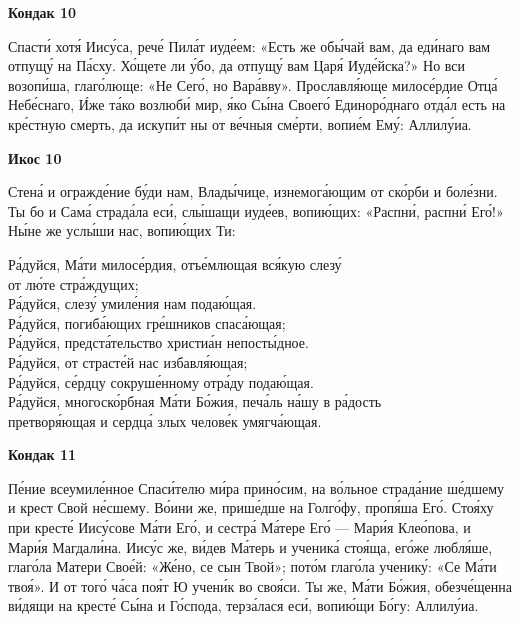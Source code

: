 \documentclass[14pt,article,oneside]{memoir}
\begin{document}
\begin{center}
  \textbf{Кондак 10}
\end{center}

Спасти́ хотя́ Иису́са, рече́ Пила́т иуде́ем: «Есть же обы́чай вам, да еди́наго вам отпущу́ на Па́сху. Хо́щете ли у́бо, да отпущу́ вам Царя́ Иуде́йска?» Но вси возопи́ша, глаго́люще: «Не Сего́, но Вара́вву». Прославля́юще милосе́рдие Отца́ Небе́снаго, И́же та́ко возлюби́ мир, я́ко Сы́на Своего́ Единоро́днаго отда́л есть на кре́стную смерть, да искупи́т ны от ве́чныя сме́рти, вопие́м Ему́: Аллилу́иа.

\begin{center}
  \textbf{Икос 10}
\end{center}

Стена́ и огражде́ние бу́ди нам, Влады́чице, изнемога́ющим от ско́рби и боле́зни. Ты бо и Сама́ страда́ла еси́, слы́шащи иуде́ев, вопию́щих: «Распни́, распни́ Его́!» Ны́не же услы́ши нас, вопию́щих Ти:

\noindent Ра́дуйся, Ма́ти милосе́рдия, отъе́млющая вся́кую слезу́\\ \vin от лю́те стра́ждущих;\\ Ра́дуйся, слезу́ умиле́ния нам подаю́щая.\\
Ра́дуйся, погиба́ющих гре́шников спаса́ющая;\\ Ра́дуйся, предста́тельство христиа́н непосты́дное.\\
Ра́дуйся, от страсте́й нас избавля́ющая;\\ Ра́дуйся, се́рдцу сокруше́нному отра́ду подаю́щая.\\
Ра́дуйся, многоско́рбная Ма́ти Бо́жия, печа́ль на́шу в ра́дость\\ \vin претворя́ющая и сердца́ злых челове́к умягча́ющая.

\begin{center}
  \textbf{Кондак 11}
\end{center}

Пе́ние всеумиле́нное Спаси́телю ми́ра прино́сим, на во́льное страда́ние ше́дшему и крест Свой не́сшему. Во́ини же, прише́дше на Голго́фу, пропя́ша Его́. Стоя́ху при кресте́ Иису́сове Ма́ти Его́, и сестра́ Ма́тере Его́ — Мари́я Клео́пова, и Мари́я Магдали́на. Иису́с же, ви́дев Ма́терь и ученика́ стоя́ща, его́же любля́ше, глаго́ла Матери Свое́й: «Же́но, се сын Твой»; пото́м глаго́ла ученику́: «Се Ма́ти твоя́». И от того́ ча́са поя́т Ю учени́к во своя́си. Ты же, Ма́ти Бо́жия, обезче́щенна ви́дящи на кресте́ Сы́на и Го́спода, терза́лася еси́, вопию́щи Бо́гу: Аллилу́иа.
\end{document}
